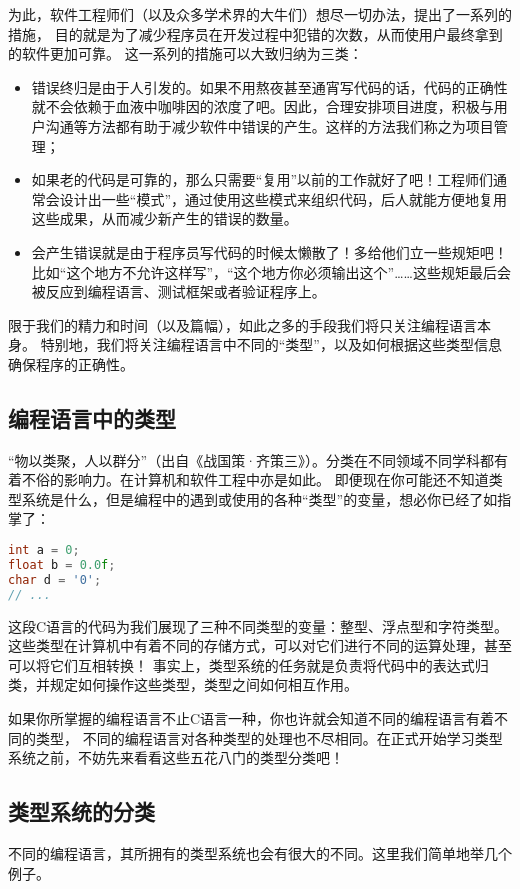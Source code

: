 \documentclass[../main.tex]{subfiles}
\begin{document}
  \indent 为此，软件工程师们（以及众多学术界的大牛们）想尽一切办法，提出了一系列的措施，
  目的就是为了减少程序员在开发过程中犯错的次数，从而使用户最终拿到的软件更加可靠。
  这一系列的措施可以大致归纳为三类：\cite{sf}
  \begin{itemize}
    \item 错误终归是由于人引发的。如果不用熬夜甚至通宵写代码的话，代码的正确性就不会依赖于血液中咖啡因的浓度了吧。因此，合理安排项目进度，积极与用户沟通等方法都有助于减少软件中错误的产生。这样的方法我们称之为项目管理；
    \item 如果老的代码是可靠的，那么只需要“复用”以前的工作就好了吧！工程师们通常会设计出一些“模式”，通过使用这些模式来组织代码，后人就能方便地复用这些成果，从而减少新产生的错误的数量。
    \item 会产生错误就是由于程序员写代码的时候太懒散了！多给他们立一些规矩吧！比如“这个地方不允许这样写”，“这个地方你必须输出这个”……这些规矩最后会被反应到编程语言、测试框架或者验证程序上。
  \end{itemize}

  \indent 限于我们的精力和时间（以及篇幅），如此之多的手段我们将只关注编程语言本身。
  特别地，我们将关注编程语言中不同的“类型”，以及如何根据这些类型信息确保程序的正确性。

  \subsection{编程语言中的类型}
  \indent “物以类聚，人以群分”（出自《战国策·齐策三》）。分类在不同领域不同学科都有着不俗的影响力。在计算机和软件工程中亦是如此。
  即便现在你可能还不知道类型系统是什么，但是编程中的遇到或使用的各种“类型”的变量，想必你已经了如指掌了：
  
\begin{lstlisting}[language=c]
int a = 0;
float b = 0.0f;
char d = '0';
// ...
\end{lstlisting}

  \indent 这段C语言的代码为我们展现了三种不同类型的变量：整型、浮点型和字符类型。
  这些类型在计算机中有着不同的存储方式，可以对它们进行不同的运算处理，甚至可以将它们互相转换！
  事实上，类型系统的任务就是负责将代码中的表达式归类，并规定如何操作这些类型，类型之间如何相互作用。\cite{typewiki}

  \indent 如果你所掌握的编程语言不止C语言一种，你也许就会知道不同的编程语言有着不同的类型，
  不同的编程语言对各种类型的处理也不尽相同。在正式开始学习类型系统之前，不妨先来看看这些五花八门的类型分类吧！

  \subsection{类型系统的分类}
  \indent 不同的编程语言，其所拥有的类型系统也会有很大的不同。这里我们简单地举几个例子。
\end{document}
